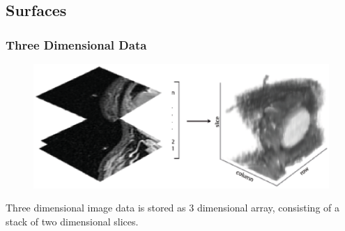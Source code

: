 \documentclass[9pt]{beamer}
\begin{document}
\subsection{Surfaces} 
\begin{frame}[shrink]
\frametitle{Three Dimensional Data}
\begin{figure}
\includegraphics[scale=0.5]{slices.eps}
\end{figure}

Three dimensional image data is stored as 3 dimensional array, consisting of a stack of two dimensional slices.
\end{frame}
\end{document}
